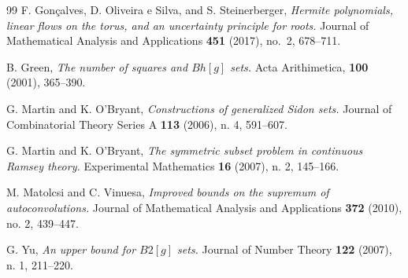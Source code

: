 \documentclass[11pt, reqno]{amsart}
\numberwithin{equation}{section}
\begin{document}
\begin{thebibliography}{99}
\newblock F. Gon\c{c}alves, D. Oliveira e Silva, and S. Steinerberger,
\newblock \emph{ Hermite polynomials, linear flows on the torus, and an uncertainty principle for roots.} 
\newblock Journal of Mathematical Analysis and Applications {\bf 451} (2017), no.~2, 678--711. 

\newblock B. Green, 
\newblock \emph{The number of squares and $Bh[g]$ sets.}
\newblock Acta Arithimetica, \textbf{100} (2001), 365--390.


\newblock G. Martin and K. O'Bryant, 
\newblock \emph{Constructions of generalized Sidon sets.}
\newblock Journal of Combinatorial Theory Series A \textbf{113} (2006), n. 4, 591--607.

\newblock G. Martin and K. O'Bryant,
\newblock \emph{The symmetric subset problem in continuous Ramsey theory.}
\newblock Experimental Mathematics \textbf{16} (2007), n. 2, 145--166.

\newblock  M. Matolcsi and C. Vinuesa, 
\newblock \emph{Improved bounds on the supremum of autoconvolutions.} 
\newblock Journal of Mathematical Analysis and Applications \textbf{372} (2010), no. 2, 439--447.

\newblock  G. Yu, 
\newblock \emph{An upper bound for $B2[g]$ sets.}
\newblock Journal of Number Theory \textbf{122} (2007), n. 1, 211--220. 


\end{thebibliography}
\end{document}
